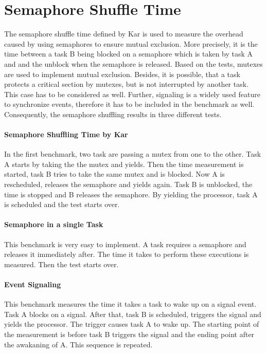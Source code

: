 \section{Semaphore Shuffle Time}
The semaphore shuffle time defined by Kar is used to measure the overhead caused by using semaphores to ensure mutual exclusion.
More precisely, it is the time between a task B being blocked on a semaphore which is taken by task A and and the unblock when the semaphore is released.  
Based on the tests, mutexes are used to implement mutual exclusion.
Besides, it is possible, that a task protects a critical section by mutexes, but is not interrupted by another task.
This case has to be considered as well.
Further, signaling is a widely used feature to synchronize events, therefore it has to be included in the benchmark as well.  
Consequently, the semaphore shuffling results in three different tests.

\paragraph{Semaphore Shuffling Time by Kar}
In the first benchmark, two task are passing a mutex from one to the other.
Task A starts by taking the the mutex and yields.
Then the time measurement is started, task B tries to take the same mutex and is blocked.
Now A is rescheduled, releases the semaphore and yields again.
Task B is unblocked, the time is stopped and B releases the semaphore.
By yielding the processor, task A is scheduled and the test starts over.
\par 
[diagram]

\paragraph{Semaphore in a single Task}
This benchmark is very easy to implement.
A task requires a semaphore and releases it immediately after.
The time it takes to perform these executions is measured.
Then the test starts over.
\par 
[diagram]

\paragraph{Event Signaling}
This benchmark measures the time it takes a task to wake up on a signal event.
Task A blocks on a signal.
After that, task B is scheduled, triggers the signal and yields the processor. 
The trigger causes task A to wake up.
The starting point of the measurement is before task B triggers the signal and the ending point after the awakaning of A.
This sequence is repeated.
\par 
[diagram] 

